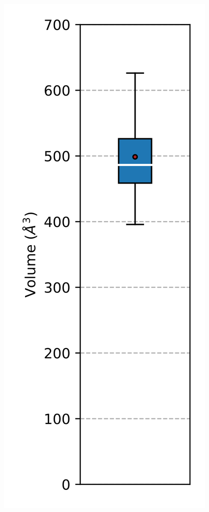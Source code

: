 \documentclass[Portugues]{phdquali}
\begin{document}
\begin{figure}
  \centering
    \includegraphics[scale=0.5]{images/mayv-c-e2-volume.png}

\end{figure}
\end{document}
